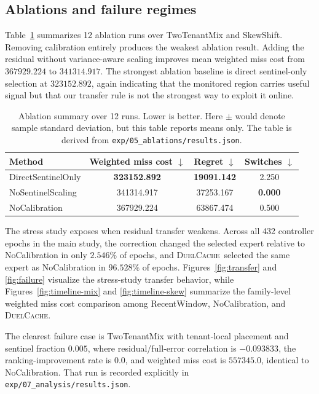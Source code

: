 \documentclass{article}
\newcommand{\duel}{\textsc{DuelCache}}
\begin{document}
\subsection{Ablations and failure regimes}

Table~\ref{tab:ablation} summarizes 12 ablation runs over TwoTenantMix and SkewShift. Removing calibration entirely produces the weakest ablation result. Adding the residual without variance-aware scaling improves mean weighted miss cost from $367929.224$ to $341314.917$. The strongest ablation baseline is direct sentinel-only selection at $323152.892$, again indicating that the monitored region carries useful signal but that our transfer rule is not the strongest way to exploit it online.

\begin{table}[t]
\caption{Ablation summary over 12 runs. Lower is better. Here $\pm$ would denote sample standard deviation, but this table reports means only. The table is derived from \texttt{exp/05\_ablations/results.json}.}
\label{tab:ablation}
\centering
\small
\begin{tabular}{lccc}
\toprule
Method & Weighted miss cost $\downarrow$ & Regret $\downarrow$ & Switches $\downarrow$ \\
\midrule
DirectSentinelOnly & \textbf{323152.892} & \textbf{19091.142} & 2.250 \\
NoSentinelScaling & 341314.917 & 37253.167 & \textbf{0.000} \\
NoCalibration & 367929.224 & 63867.474 & 0.500 \\
\bottomrule
\end{tabular}
\end{table}

The stress study exposes when residual transfer weakens. Across all 432 controller epochs in the main study, the correction changed the selected expert relative to NoCalibration in only $2.546\%$ of epochs, and \duel\ selected the same expert as NoCalibration in $96.528\%$ of epochs. Figures~\ref{fig:transfer} and \ref{fig:failure} visualize the stress-study transfer behavior, while Figures~\ref{fig:timeline-mix} and \ref{fig:timeline-skew} summarize the family-level weighted miss cost comparison among RecentWindow, NoCalibration, and \duel.

The clearest failure case is TwoTenantMix with tenant-local placement and sentinel fraction $0.005$, where residual/full-error correlation is $-0.093833$, the ranking-improvement rate is $0.0$, and weighted miss cost is $557345.0$, identical to NoCalibration. That run is recorded explicitly in \texttt{exp/07\_analysis/results.json}.
\end{document}

